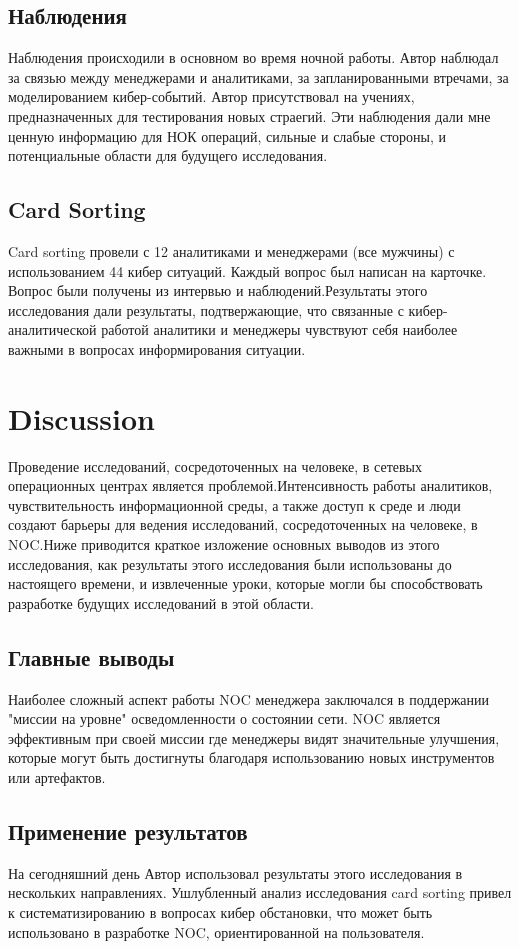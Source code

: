 \documentclass[12pt,]{article}
\begin{document}
\subsection{Наблюдения}
Наблюдения происходили в основном во время ночной работы. Автор наблюдал за связью между менеджерами и аналитиками, за запланированными втречами, за моделированием кибер-событий. Автор присутствовал на учениях, предназначенных для тестирования новых страегий. Эти наблюдения дали мне ценную информацию для НОК операций, сильные и слабые стороны, и потенциальные области для будущего исследования.
\subsection{Card Sorting}
Card sorting провели с 12 аналитиками и менеджерами (все мужчины) с использованием 44 кибер ситуаций. Каждый вопрос был написан на карточке. Вопрос были получены из интервью и наблюдений.Результаты этого исследования дали результаты, подтвержающие, что связанные с кибер-аналитической работой аналитики и менеджеры чувствуют себя наиболее важными в вопросах информирования ситуации.   
\section{Discussion}
Проведение исследований, сосредоточенных на человеке, в сетевых операционных центрах является проблемой.Интенсивность работы аналитиков, чувствительность информационной среды, а также доступ к среде и люди создают барьеры для ведения исследований, сосредоточенных на человеке, в NOC.Ниже приводится краткое изложение основных выводов из этого исследования, как результаты этого исследования были использованы до настоящего времени, и извлеченные уроки, которые могли бы способствовать разработке будущих исследований в этой области.
\subsection{Главные выводы}
Наиболее сложный аспект работы NOC менеджера заключался в поддержании "миссии на уровне" осведомленности о состоянии сети. NOC является эффективным при своей миссии где менеджеры видят значительные улучшения, которые могут быть достигнуты благодаря использованию новых инструментов или артефактов.
\subsection{Применение результатов}
На сегодняшний день Автор использовал результаты этого исследования в нескольких направлениях. Ушлубленный анализ исследования card sorting привел к систематизированию в вопросах кибер обстановки, что  может быть использовано в разработке NOC, ориентированной на пользователя.
\end{document}
